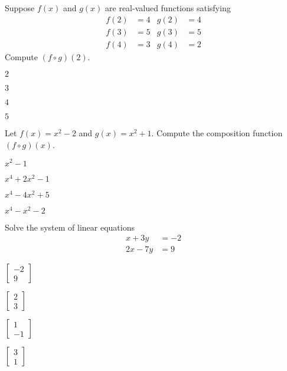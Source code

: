 \documentclass{article}
\begin{document}
\begin{readinessAssuranceTest}
\setcounter{enumi}{40}
\item Suppose $f(x)$ and $g(x)$ are real-valued functions satisfying
\begin{align*}
f(2) &= 4 & g(2) & = 4 \\
f(3) &= 5 & g(3) &= 5 \\
f(4) &= 3 & g(4) &= 2
\end{align*}
Compute $(f \circ g)(2)$.
\begin{multicols}{4}
\begin{readinessAssuranceTestChoices}
\item $2$
\item $3$ %
\item $4$
\item $5$
\end{readinessAssuranceTestChoices}
\end{multicols}

\item Let $f(x) = x^2-2$ and $g(x)= x^2+1$.  Compute the composition function $(f \circ g)(x)$.
\begin{multicols}{4}
\begin{readinessAssuranceTestChoices}
\item $x^2-1$
\item $x^4+2x^2-1$ %
\item $x^4-4x^2+5$
\item $x^4-x^2-2$
\end{readinessAssuranceTestChoices}
\end{multicols}



\item Solve the system of linear equations
\begin{align*}
x+3y &= -2 \\
2x-7y &= 9
\end{align*}

\begin{multicols}{4}
\begin{readinessAssuranceTestChoices}
\item $\begin{bmatrix} -2 \\ 9 \end{bmatrix}$
\item $\begin{bmatrix} 2 \\ 3 \end{bmatrix}$
\item $\begin{bmatrix} 1 \\ -1 \end{bmatrix}$ %
\item $\begin{bmatrix} 3 \\ 1 \end{bmatrix}$
\end{readinessAssuranceTestChoices}
\end{multicols}


\end{readinessAssuranceTest}
\end{document}
